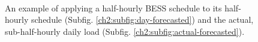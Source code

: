 \begin{figure}\centering
	\\
	\caption{An example of applying a half-hourly BESS schedule to its half-hourly schedule (Subfig. \ref{ch2:subfig:day-forecasted}) and the actual, sub-half-hourly daily load (Subfig. \ref{ch2:subfig:actual-forecasted}).}
	\label{ch2:fig:cost-sample}
\end{figure}